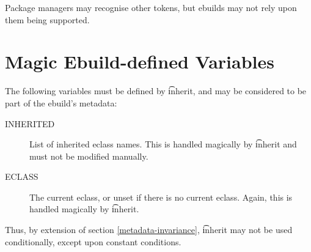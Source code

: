 Package managers may recognise other tokens, but ebuilds may not rely upon them being supported.

\section{Magic Ebuild-defined Variables}

The following variables must be defined by \t{inherit}, and may be considered to be part
of the ebuild's metadata:

\begin{description}
\item[INHERITED] List of inherited eclass names. This is handled magically by \t{inherit} and
    must not be modified manually.
\item[ECLASS] The current eclass, or unset if there is no current eclass. Again, this is handled
    magically by \t{inherit}.
\end{description}

\note Thus, by extension of section \ref{metadata-invariance}, \t{inherit} may not be used
    conditionally, except upon constant conditions.

